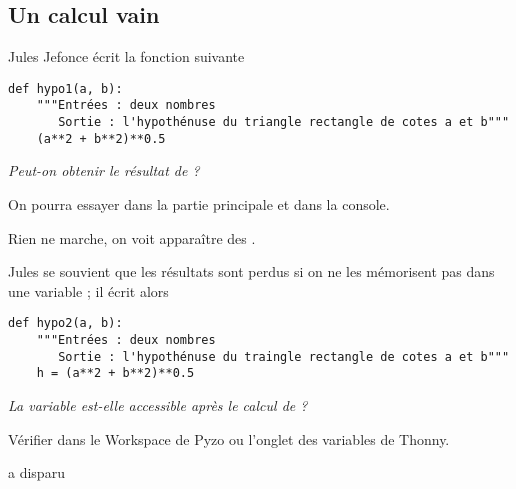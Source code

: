 \subsection{Un calcul vain} 
Jules Jefonce écrit la fonction suivante 
\begin{lstlisting}
def hypo1(a, b):
    """Entrées : deux nombres
       Sortie : l'hypothénuse du triangle rectangle de cotes a et b"""
    (a**2 + b**2)**0.5
\end{lstlisting}
\begin{Exercise}
\it Peut-on obtenir le résultat de  ?

On pourra essayer  dans la partie principale et  dans la console.
\end{Exercise}
\begin{Answer}
Rien ne marche, on voit apparaître des .
\end{Answer} 

\medskip

Jules se souvient que les résultats sont perdus si on ne les mémorisent pas dans une variable ; il écrit alors
\begin{lstlisting}
def hypo2(a, b):
    """Entrées : deux nombres
       Sortie : l'hypothénuse du traingle rectangle de cotes a et b"""
    h = (a**2 + b**2)**0.5
\end{lstlisting}
\begin{Exercise}
\it La variable  est-elle accessible après le calcul de  ?

Vérifier dans le Workspace de Pyzo ou l'onglet des variables de Thonny.
\end{Exercise}
\begin{Answer}
  a disparu
\end{Answer} 
